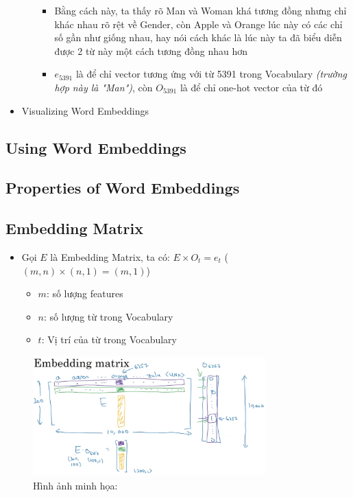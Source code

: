 \documentclass[12pt,a4paper]{report}
\begin{document}
\begin{itemize}
\begin{itemize}
\begin{itemize}
					\item Bằng cách này, ta thấy rõ Man và Woman khá tương đồng nhưng chỉ khác nhau rõ rệt về Gender, còn Apple và Orange lúc này có các chỉ số gần như giống nhau, hay nói cách khác là lúc này ta đã biểu diễn được 2 từ này một cách tương đồng nhau hơn
					\item $e_{5391}$ là để chỉ vector tương ứng với từ 5391 trong Vocabulary \textit{(trường hợp này là "Man")}, còn $O_{5391}$ là để chỉ one-hot vector của từ đó
					\end{itemize}
				\end{itemize}
			\item Visualizing Word Embeddings
			\end{itemize}
		\subsection{Using Word Embeddings}
		\subsection{Properties of Word Embeddings}
		\subsection{Embedding Matrix}
			\begin{itemize}
			\item Gọi $E$ là Embedding Matrix, ta có: $E \times O_t = e_t$ ($(m, n) \times (n, 1) = (m, 1)$)
				\begin{itemize}
				\item $m$: số lượng features
				\item $n$: số lượng từ trong Vocabulary
				\item $t$: Vị trí của từ trong Vocabulary
				\end{itemize}
			\end{itemize}
			\begin{figure}[h]
					\caption{Hình ảnh minh họa:}
					\centering
					\includegraphics[width=0.8\textwidth]{3}
				\end{figure}
\end{document}
